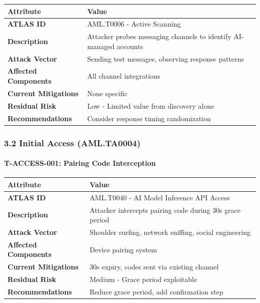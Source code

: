 \begin{table}[h]
\centering
\small
\begin{tabular}{|l|l|}
\hline
Attribute & Value \\
\hline
\textbf{ATLAS ID} & AML.T0006 - Active Scanning \\
\hline
\textbf{Description} & Attacker probes messaging channels to identify AI-managed accounts \\
\hline
\textbf{Attack Vector} & Sending test messages, observing response patterns \\
\hline
\textbf{Affected Components} & All channel integrations \\
\hline
\textbf{Current Mitigations} & None specific \\
\hline
\textbf{Residual Risk} & Low - Limited value from discovery alone \\
\hline
\textbf{Recommendations} & Consider response timing randomization \\
\hline
\end{tabular}
\end{table}



\hrulefill


\subsubsection{3.2 Initial Access (AML.TA0004)}


\paragraph{T-ACCESS-001: Pairing Code Interception}



\begin{table}[h]
\centering
\small
\begin{tabular}{|l|l|}
\hline
Attribute & Value \\
\hline
\textbf{ATLAS ID} & AML.T0040 - AI Model Inference API Access \\
\hline
\textbf{Description} & Attacker intercepts pairing code during 30s grace period \\
\hline
\textbf{Attack Vector} & Shoulder surfing, network sniffing, social engineering \\
\hline
\textbf{Affected Components} & Device pairing system \\
\hline
\textbf{Current Mitigations} & 30s expiry, codes sent via existing channel \\
\hline
\textbf{Residual Risk} & Medium - Grace period exploitable \\
\hline
\textbf{Recommendations} & Reduce grace period, add confirmation step \\
\hline
\end{tabular}
\end{table}



